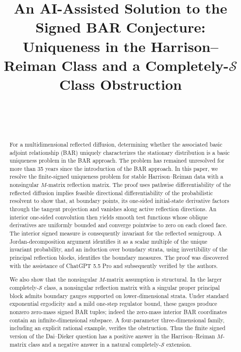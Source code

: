 \documentclass[aihp]{imsart}
\numberwithin{equation}{section}
\theoremstyle{plain}
\theoremstyle{definition}
\newcommand{\1}{\mathbf 1}
\begin{document}
\begin{frontmatter}
\title{\vspace{-0.6in}An AI-Assisted Solution to the Signed BAR Conjecture: Uniqueness in the Harrison--Reiman Class and a Completely-$\mathcal{S}$ Class Obstruction}

\begin{aug}
\author[A]{~}
\author[A]{~}
\address[A]{Department of Industrial Engineering and Management Sciences,
McCormick School of Engineering, Northwestern University.}
\end{aug}

\begin{abstract}
For a multidimensional reflected diffusion, determining whether the associated basic adjoint relationship (BAR) uniquely characterizes the stationary distribution is a basic uniqueness problem in the BAR approach. The problem has remained unresolved for more than 35 years since the introduction of the BAR approach. In this paper, we resolve the finite-signed uniqueness problem for stable Harrison--Reiman data with a nonsingular $M$-matrix reflection matrix. The proof uses pathwise differentiability of the reflected diffusion implies feasible directional differentiability of the probabilistic resolvent to show that, at boundary points, its one-sided initial-state derivative factors through the tangent projection and vanishes along active reflection directions. An interior one-sided convolution then yields smooth test functions whose oblique derivatives are uniformly bounded and converge pointwise to zero on each closed face. The interior signed measure is consequently invariant for the reflected semigroup. A Jordan-decomposition argument identifies it as a scalar multiple of the unique invariant probability, and an induction over boundary strata, using invertibility of the principal reflection blocks, identifies the boundary measures. The proof was discovered with the assistance of ChatGPT 5.5 Pro and subsequently verified by the authors.



We also show that the nonsingular $M$-matrix assumption is structural. In the larger completely-$\mathcal{S}$ class, a nonsingular reflection matrix with a singular proper principal block admits boundary gauges supported on lower-dimensional strata. Under standard exponential ergodicity and a mild one-step regulator bound, these gauges produce nonzero zero-mass signed BAR tuples; indeed the zero-mass interior BAR coordinates contain an infinite-dimensional subspace. A four-parameter three-dimensional family, including an explicit rational example, verifies the obstruction. Thus the finite signed version of the Dai--Dieker question has a positive answer in the Harrison--Reiman $M$-matrix class and a negative answer in a natural completely-$\mathcal{S}$ extension.
\end{abstract}


\end{frontmatter}
\end{document}

